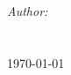 \begin{titlepage}
\HRule \\[1.5cm]
{ \huge \bfseries \projectTitle}\\[0.4cm] %
\HRule \\[1.5cm]
 

\emph{Author:}\\
\authorFN \textsc{ \authorLN} \\
\matricle\\[2.0cm] %


\vfill
{\large  \today} %

\end{titlepage}
